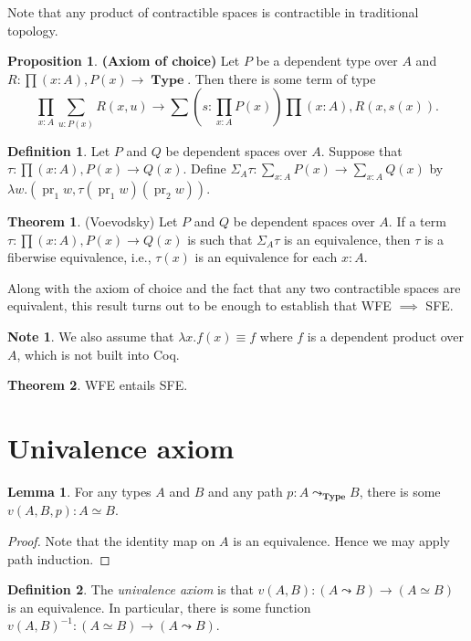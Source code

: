 \documentclass[10pt,letterpaper,cm]{nupset}
\theoremstyle{definition}
\newtheorem*{definition}{Definition}
\newtheorem{note}{Note}
\newtheorem{theorem}{Theorem}
\newtheorem{lemma}{Lemma}
\newtheorem{prop}{Proposition}
\newcommand{\1}{\mathbf{1}}
\newcommand{\0}{\vec 0}
\DeclareMathOperator{\pr}{pr}
\DeclareMathOperator{\type}{\mathbf{Type}}
\begin{document}
Note that any product of contractible spaces is contractible in traditional topology. 

\begin{prop}{\textbf{(Axiom of choice)}}
Let $P$ be a dependent type over $A$ and $R : \prod(x:A), P(x) \to \type$. Then there is some term of type $$\prod_{x:A}\sum_{u:P(x)} R(x, u) \to \sum(s:  \prod_{x:A} P(x)) \prod (x:A), R(x, s(x)) .$$
\end{prop}

\begin{definition}
Let $P$ and $Q$ be dependent spaces over $A$. Suppose that $\tau : \prod(x:A), P(x) \to Q(x)$. Define $\Sigma_A\tau : \sum_{x:A}P(x) \to \sum_{x:A} Q(x)$ by $\lambda w. (\pr_1 w, \tau(\pr_1w)(\pr_2w))$.
\end{definition}

\begin{theorem}{(Voevodsky)}
Let $P$ and $Q$ be dependent spaces over $A$. If a term $\tau : \prod(x:A), P(x) \to Q(x)$ is such that $\Sigma_A \tau$ is an equivalence, then $\tau$ is a fiberwise equivalence, i.e., $\tau(x)$ is an equivalence for each $x:A$. 
\end{theorem}

Along with the axiom of choice and the fact that any two contractible spaces are equivalent, this result turns out to be enough to establish that WFE $\implies$ SFE.

\begin{note}
We also assume that $\lambda x. f(x) \equiv f$ where $f$ is a dependent product over $A$, which is not built into Coq.
\end{note}

\begin{theorem}
WFE entails SFE.
\end{theorem}


\section{Univalence axiom}

\begin{lemma}
For any types $A$ and $B$ and any path $p: A \leadsto_{\type} B$, there is some $v(A, B, p) : A \simeq B$.  
\end{lemma}
\begin{proof}
Note that the identity map on $A$ is an equivalence. Hence we may apply path induction. 
\end{proof}

\begin{definition}
The \textit{univalence axiom} is that $v(A, B) : (A \leadsto B) \to (A \simeq B)$ is an equivalence. In particular, there is some function $v(A, B) ^{-1}: (A \simeq B) \to (A \leadsto B)$.
\end{definition}
\end{document}
